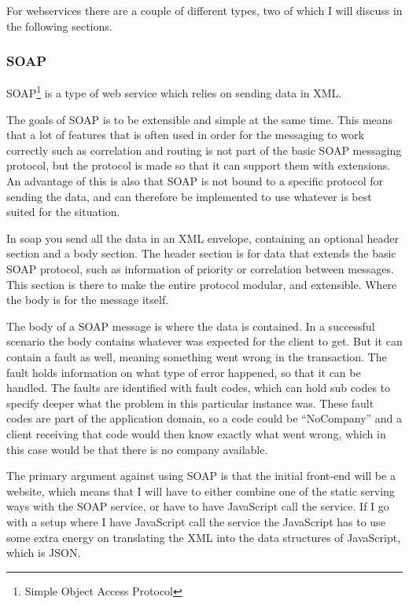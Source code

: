 For webservices there are a couple of different types, two of which I will discuss
in the following sections. 

\subsubsection{SOAP}
\label{subs:SOAP}
SOAP\footnote{Simple Object Access Protocol} is a type of web service which
relies on sending data in XML.\ 

The goals of SOAP is to be extensible and simple at the same
time\cite{soap:messaging}. This means that a lot of features that is often used
in order for the messaging to work correctly such as correlation and routing is
not part of the basic SOAP messaging protocol, but the protocol is made so that
it can support them with extensions. An advantage of this is also that SOAP is
not bound to a specific protocol for sending the data, and can therefore be
implemented to use whatever is best suited for the situation. 

In soap you send all the data in an XML envelope, containing an optional header
section and a body section. The header section is for data that extends the
basic SOAP protocol, such as information of priority or correlation between
messages\cite{soap:messaging}. This section is there to make the entire protocol
modular, and extensible. Where the body is for the message itself. 

The body of a SOAP message is where the data is contained. In a successful
scenario the body contains whatever was expected for the client to get. But it
can contain a fault as well, meaning something went wrong in the transaction.
The fault holds information on what type of error happened, so that it can be
handled. The faults are identified with fault codes, which can hold sub codes to
specify deeper what the problem in this particular instance was. These fault
codes are part of the application domain, so a code could be ``NoCompany'' and a
client receiving that code would then know exactly what went wrong, which in
this case would be that there is no company available. 

The primary argument against using SOAP is that the initial front-end will be a
website, which means that I will have to either combine one of the static
serving ways with the SOAP service, or have to have JavaScript call the service.
If I go with a setup where I have JavaScript call the service the JavaScript has
to use some extra energy on translating the XML into the data structures of
JavaScript, which is JSON.\

